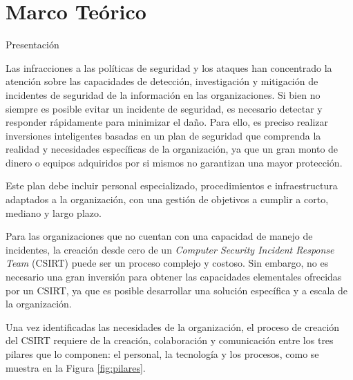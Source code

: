 \chapter{\Large Marco Teórico}
    \begin{section}{Presentación}
    
        Las infracciones a las políticas de seguridad y los ataques han concentrado la atención sobre las capacidades de detección, investigación y mitigación de incidentes de seguridad de la información en  las organizaciones. Si bien no siempre es posible evitar un incidente de seguridad, es necesario detectar y responder rápidamente para minimizar el daño. Para ello, es preciso realizar inversiones inteligentes basadas en un plan de seguridad que comprenda la realidad y necesidades específicas de la organización, ya que un gran monto de dinero o equipos adquiridos por si mismos no garantizan una mayor protección. \par
        Este plan debe incluir personal especializado, procedimientos e infraestructura  adaptados a la organización, con una gestión de objetivos a cumplir a corto, mediano y largo plazo. \par
        Para las organizaciones que no cuentan con una capacidad de manejo de incidentes, la creación desde cero de un \textit{Computer Security Incident Response Team} (CSIRT) puede ser un proceso complejo y costoso. Sin embargo, no es necesario una gran inversión para obtener las capacidades elementales ofrecidas por un CSIRT, ya que es posible desarrollar una solución específica y a escala de la organización. \par
        Una vez identificadas las necesidades de la organización, el proceso de creación del CSIRT requiere de la creación, colaboración y comunicación entre los tres pilares que lo componen: el personal, la tecnología y los procesos, como se muestra en la Figura \ref{fig:pilares}. \par
        

\end{section}
